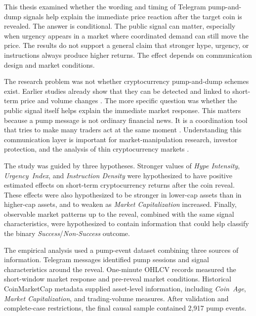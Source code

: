 This thesis examined whether the wording and timing of Telegram pump-and-dump signals help explain the immediate price reaction after the target coin is revealed. The answer is conditional. The public signal can matter, especially when urgency appears in a market where coordinated demand can still move the price. The results do not support a general claim that stronger hype, urgency, or instructions always produce higher returns. The effect depends on communication design and market conditions.

The research problem was not whether cryptocurrency pump-and-dump schemes exist. Earlier studies already show that they can be detected and linked to short-term price and volume changes \cite{kamps2018pump, xu2019anatomy, hamrick2021examination, lamorgia2020pump, li2021cryptocurrency}. The more specific question was whether the public signal itself helps explain the immediate market response. This matters because a pump message is not ordinary financial news. It is a coordination tool that tries to make many traders act at the same moment \cite{morris2002social, xu2019anatomy, lamorgia2023doge}. Understanding this communication layer is important for market-manipulation research, investor protection, and the analysis of thin cryptocurrency markets \cite{amihud2002illiquidity, hamrick2021examination, charfeddine2024drives}.

The study was guided by three hypotheses. Stronger values of \textit{Hype Intensity}, \textit{Urgency~Index}, and \textit{Instruction Density} were hypothesized to have positive estimated effects on short-term cryptocurrency returns after the coin reveal. These effects were also hypothesized to be stronger in lower-cap assets than in higher-cap assets, and to weaken as \textit{Market Capitalization} increased. Finally, observable market patterns up to the reveal, combined with the same signal characteristics, were hypothesized to contain information that could help classify the binary \textit{Success}/\textit{Non-Success} outcome.

The empirical analysis used a pump-event dataset combining three sources of information. Telegram messages identified pump sessions and signal characteristics around the reveal. One-minute OHLCV records measured the short-window market response and pre-reveal market conditions. Historical CoinMarketCap metadata supplied asset-level information, including \textit{Coin~Age}, \textit{Market Capitalization}, and trading-volume measures. After validation and complete-case restrictions, the final causal sample contained 2,917 pump events.

